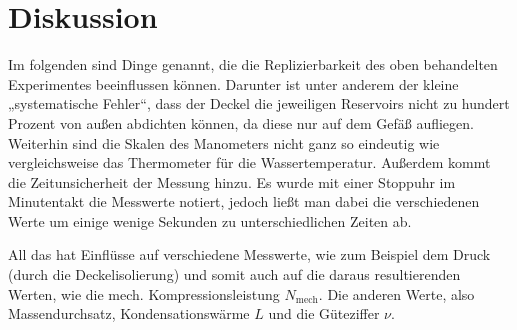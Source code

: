 \section{Diskussion}
\label{sec:Diskussion}

Im folgenden sind Dinge genannt, die die Replizierbarkeit des oben behandelten Experimentes beeinflussen können.
Darunter ist unter anderem der kleine „systematische Fehler“, dass der Deckel die jeweiligen Reservoirs nicht
zu hundert Prozent von außen abdichten können, da diese nur auf dem Gefäß aufliegen.
Weiterhin sind die Skalen des Manometers nicht ganz so eindeutig wie vergleichsweise das Thermometer für die Wassertemperatur.
Außerdem kommt die Zeitunsicherheit der Messung hinzu.
Es wurde mit einer Stoppuhr im Minutentakt die Messwerte notiert, jedoch ließt man dabei die verschiedenen Werte
um einige wenige Sekunden zu unterschiedlichen Zeiten ab.

All das hat Einflüsse auf verschiedene Messwerte, wie zum Beispiel dem Druck (durch die Deckelisolierung) und
somit auch auf die daraus resultierenden Werten, wie die mech. Kompressionsleistung $N_\text{mech}$.
Die anderen Werte, also Massendurchsatz, Kondensationswärme $L$ und die Güteziffer $\nu$.